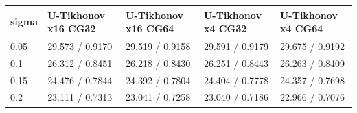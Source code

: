 \begin{tabular}{lllll}
\toprule
sigma & U-Tikhonov x16 CG32 & U-Tikhonov x16 CG64 & U-Tikhonov x4 CG32 & U-Tikhonov x4 CG64 \\
\midrule
0.05 & 29.573 / 0.9170 & 29.519 / 0.9158 & 29.591 / 0.9179 & 29.675 / 0.9192 \\
0.1 & 26.312 / 0.8451 & 26.218 / 0.8430 & 26.251 / 0.8443 & 26.263 / 0.8409 \\
0.15 & 24.476 / 0.7844 & 24.392 / 0.7804 & 24.404 / 0.7778 & 24.357 / 0.7698 \\
0.2 & 23.111 / 0.7313 & 23.041 / 0.7258 & 23.040 / 0.7186 & 22.966 / 0.7076 \\
\bottomrule
\end{tabular}

